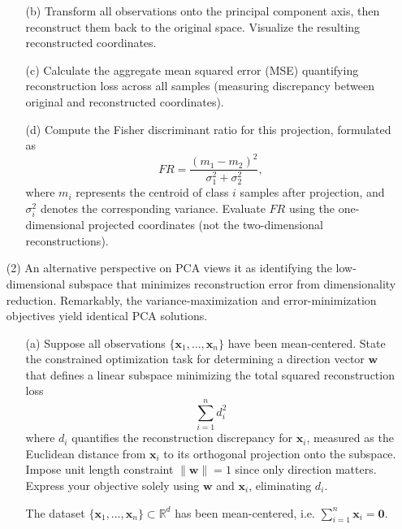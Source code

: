 \documentclass[11pt,addpoints,answers]{exam}
\begin{document}
\begin{enumerate}
\begin{enumerate}
			\item[(b)] Transform all observations onto the principal component axis, then reconstruct them back to the original space. Visualize the resulting reconstructed coordinates.
			
			\item[(c)] Calculate the aggregate mean squared error (MSE) quantifying reconstruction loss across all samples (measuring discrepancy between original and reconstructed coordinates).
			
			\item[(d)] Compute the Fisher discriminant ratio for this projection, formulated as 
			\[
			FR = \frac{(m_{1} - m_{2})^{2}}{\sigma_{1}^{2} + \sigma_{2}^{2}},
			\]
			where $m_{i}$ represents the centroid of class $i$ samples after projection, and $\sigma_{i}^{2}$ denotes the corresponding variance. Evaluate $FR$ using the one-dimensional projected coordinates (not the two-dimensional reconstructions).
		\end{enumerate}

		
		
		\item[(2)] An alternative perspective on PCA views it as identifying the low-dimensional subspace that minimizes reconstruction error from dimensionality reduction. Remarkably, the variance-maximization and error-minimization objectives yield identical PCA solutions.
		
		\begin{enumerate}
			\item[(a)] Suppose all observations $\{\mathbf{x}_{1}, \dots, \mathbf{x}_{n}\}$ have been mean-centered. State the constrained optimization task for determining a direction vector $\mathbf{w}$ that defines a linear subspace minimizing the total squared reconstruction loss
			\[
			\sum_{i=1}^{n} d_{i}^{2}
			\]
			where $d_{i}$ quantifies the reconstruction discrepancy for $\mathbf{x}_{i}$, measured as the Euclidean distance from $\mathbf{x}_{i}$ to its orthogonal projection onto the subspace. Impose unit length constraint $\|\mathbf{w}\|=1$ since only direction matters. Express your objective solely using $\mathbf{w}$ and $\mathbf{x}_{i}$, eliminating $d_{i}$.
			
			\begin{your_solution}
				The dataset \(\{\mathbf{x}_1,\dots,\mathbf{x}_n\}\subset\mathbb{R}^d\) has been mean-centered, i.e. \(\sum_{i=1}^n\mathbf{x}_i=\mathbf{0}\). 
				

\end{your_solution}
\end{enumerate}
\end{enumerate}
\end{document}
